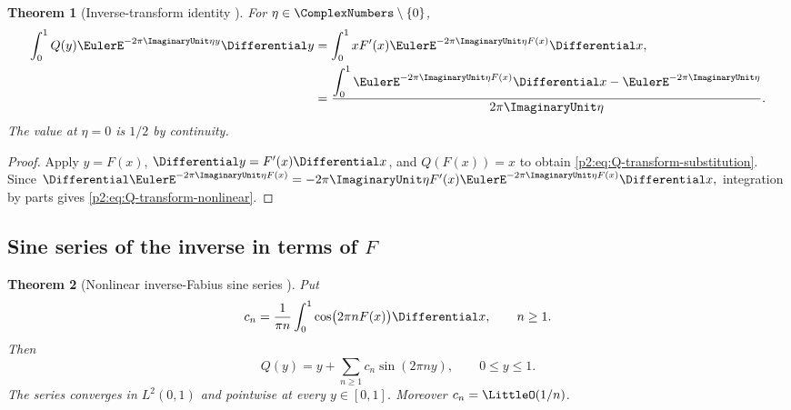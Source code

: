 \documentclass[11pt]{article}
\newtheorem{theorem}{Theorem}[section]
\theoremstyle{definition}
\theoremstyle{remark}
\begin{document}
\begin{theorem}[Inverse-transform identity \New]
For $\eta\in\ComplexNumbers\setminus\{0\}$,
\begin{align}
 \int_0^1Q(y)\EulerE^{-2\pi\ImaginaryUnit\eta y}\Differential y
 &=\int_0^1xF'(x)\EulerE^{-2\pi\ImaginaryUnit\eta F(x)}\Differential x,            \label{p2:eq:Q-transform-substitution}\\
 &=\frac{\displaystyle\int_0^1\EulerE^{-2\pi\ImaginaryUnit\eta F(x)}\Differential x
       -\EulerE^{-2\pi\ImaginaryUnit\eta}}
 {2\pi\ImaginaryUnit\eta}.                                        \label{p2:eq:Q-transform-nonlinear}
\end{align}
The value at $\eta=0$ is $1/2$ by continuity.
\end{theorem}

\begin{proof}
Apply $y=F(x)$, $\Differential y=F'(x)\Differential x$, and $Q(F(x))=x$ to obtain
\eqref{p2:eq:Q-transform-substitution}.  Since
\(
 \Differential\EulerE^{-2\pi\ImaginaryUnit\eta F(x)}
 =-2\pi\ImaginaryUnit\eta F'(x)\EulerE^{-2\pi\ImaginaryUnit\eta F(x)}\Differential x,
\)
integration by parts gives \eqref{p2:eq:Q-transform-nonlinear}.
\end{proof}

\subsection{Sine series of the inverse in terms of \texorpdfstring{$F$}{F}}

\begin{theorem}[Nonlinear inverse-Fabius sine series \New]
Put
\begin{equation}
 c_n=\frac{1}{\pi n}\int_0^1\cos\bigl(2\pi nF(x)\bigr)\Differential x,
 \qquad n\ge1.                                           \label{p2:eq:Q-sine-coeff}
\end{equation}
Then
\begin{equation}
 \boxed{\quad
 Q(y)=y+\sum_{n\ge1}c_n\sin(2\pi ny),
 \qquad 0\le y\le1.
 \quad}                                                  \label{p2:eq:Q-sine-series}
\end{equation}
The series converges in $L^2(0,1)$ and pointwise at every $y\in[0,1]$.  Moreover
$c_n=\LittleO(1/n)$.
\end{theorem}
\end{document}
